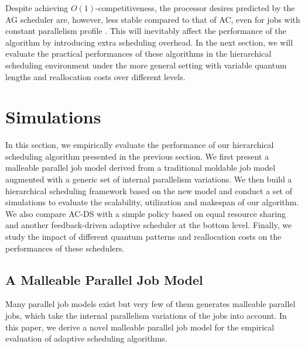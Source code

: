 \documentclass[10pt, a4paper]{article}
\begin{document}
Despite achieving $O(1)$-competitiveness, the processor desires predicted by the AG scheduler are,
however, less stable compared to that of AC, even for jobs with constant parallelism profile
\cite{SunCaHs11,SunHs08}. This will inevitably affect the performance of the algorithm by
introducing extra scheduling overhead. In the next section, we will evaluate the practical
performances of these algorithms in the hierarchical scheduling environment under the more general
setting with variable quantum lengths and reallocation costs over different levels.


\section{Simulations}

In this section, we empirically evaluate the performance of our hierarchical scheduling algorithm
presented in the previous section. We first present a malleable parallel job model derived from a
traditional moldable job model augmented with a generic set of internal parallelism variations. We
then build a hierarchical scheduling framework based on the new model and conduct a set of
simulations to evaluate the scalability, utilization and makespan of our algorithm. We also compare
AC-DS with a simple policy based on equal resource sharing and another feedback-driven adaptive
scheduler at the bottom level. Finally, we study the impact of different quantum patterns and
reallocation costs on the performances of these schedulers.

\subsection{A Malleable Parallel Job Model}

Many parallel job models exist but very few of them generates malleable parallel jobs, which take
the internal parallelism variations of the jobs into account. In this paper, we derive a novel
malleable parallel job model for the empirical evaluation of adaptive scheduling algorithms.
\end{document}
